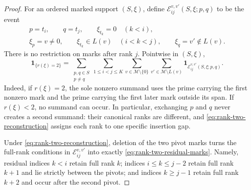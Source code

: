\documentclass[11pt]{article}
\numberwithin{equation}{section}
\theoremstyle{plain}
\newcommand{\1}{\mathbf 1}
\newcommand{\cM}{\mathcal M}
\begin{document}
\begin{proof}
For an ordered marked support $(S,\xi)$, define
$\mathcal E_{ij}^{v,v'}(S,\xi;p,q)$ to be the event
\[
 \begin{gathered}
 p=t_i,\qquad q=t_j,\qquad
 \xi_{t_k}=0\quad(k<i),\\
 \xi_p=v\ne0,\qquad
 \xi_{t_k}\in L(v)\quad(i<k<j),\qquad
 \xi_q=v'\notin L(v).
 \end{gathered}
\]
There is no restriction on marks after rank $j$.  Pointwise in
$(S,\xi)$,
\begin{equation}\label{eq:rank-two-canonical-identity}
 \1_{\{r(\xi)=2\}}
 =
 \sum_{\substack{p,q\in S\\p\ne q}}
 \sum_{1\le i<j\le K}
 \sum_{v\in\cM\setminus\{0\}}
 \sum_{v'\in\cM\setminus L(v)}
 \1_{\mathcal E_{ij}^{v,v'}(S,\xi;p,q)}.
\end{equation}
Indeed, if $r(\xi)=2$, the sole nonzero summand uses the prime carrying
the first nonzero mark and the prime carrying the first later mark outside
its span.  If $r(\xi)<2$, no summand can occur.  In particular, exchanging
$p$ and $q$ never creates a second summand: their canonical ranks are
different, and \eqref{eq:rank-two-reconstruction} assigns each rank to one
specific insertion gap.

Under \eqref{eq:rank-two-reconstruction}, deletion of the two pivot marks
turns the full-rank conditions in
$\mathcal E_{ij}^{v,v'}$ into exactly
\eqref{eq:rank-two-residual-marks}.  Namely, residual indices $k<i$
retain full rank $k$; indices $i\le k\le j-2$ retain full rank $k+1$ and
lie strictly between the pivots; and indices $k\ge j-1$ retain full rank
$k+2$ and occur after the second pivot.


\end{proof}
\end{document}
